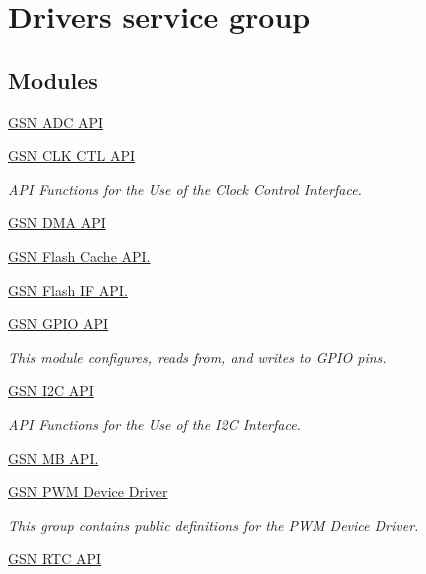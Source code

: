 \hypertarget{a00682}{
\section{Drivers service group}
\label{a00682}
}
\subsection*{Modules}
\begin{DoxyCompactItemize}
\item 
\hyperlink{a00643}{GSN ADC API}
\item 
\hyperlink{a00644}{GSN CLK CTL API}


\begin{DoxyCompactList}\small\item\em API Functions for the Use of the Clock Control Interface. \end{DoxyCompactList}

\item 
\hyperlink{a00645}{GSN DMA API}
\item 
\hyperlink{a00646}{GSN Flash Cache API.}
\item 
\hyperlink{a00647}{GSN Flash IF API.}
\item 
\hyperlink{a00648}{GSN GPIO API}


\begin{DoxyCompactList}\small\item\em This module configures, reads from, and writes to GPIO pins. \end{DoxyCompactList}

\item 
\hyperlink{a00649}{GSN I2C API}


\begin{DoxyCompactList}\small\item\em API Functions for the Use of the I2C Interface. \end{DoxyCompactList}

\item 
\hyperlink{a00624}{GSN MB API.}
\item 
\hyperlink{a00650}{GSN PWM Device Driver}


\begin{DoxyCompactList}\small\item\em This group contains public definitions for the PWM Device Driver. \end{DoxyCompactList}

\item 
\hyperlink{a00651}{GSN RTC API}



\end{DoxyCompactItemize}
